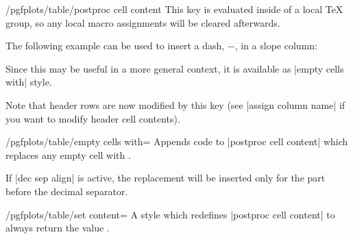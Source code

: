 \documentclass[a4paper]{ltxdoc}
\begin{document}
\begin{codekey}{/pgfplots/table/postproc cell content}
    This key is evaluated inside of a local \TeX{} group, so any local macro
    assignments will be cleared afterwards.

    The following example can be used to insert a dash, $-$, in a slope column:
\begin{codeexample}[]

\end{codeexample}
    Since this may be useful in a more general context, it is available as
    |empty cells with| style.

    Note that header rows are now modified by this key (see
    |assign column name| if you want to modify header cell contents).
\end{codekey}

\begin{stylekey}{/pgfplots/table/empty cells with=}
    Appends code to |postproc cell content| which replaces any empty cell with
    .

    If |dec sep align| is active, the replacement will be inserted only for the
    part before the decimal separator.
\end{stylekey}

\begin{stylekey}{/pgfplots/table/set content=}
    A style which redefines |postproc cell content| to always return the value
    .
\end{stylekey}
\end{document}
